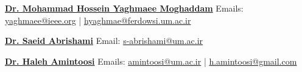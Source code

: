 \documentclass[10pt,a4paper,sans]{moderncv}        %
\begin{document}
\begin{multicols}{2}
	
\cvitem{} {\href{https://scholar.google.com/citations?hl=en&user=ZZrN9q8AAAAJ}{\textbf{Dr. Mohammad Hossein Yaghmaee Moghaddam}}}
\cvitem{} {Emails: \href{mailto:yaghmaee@ieee.org}{yaghmaee@ieee.org} | \href{mailto:hyaghmae@ferdowsi.um.ac.ir}{hyaghmae@ferdowsi.um.ac.ir}}


\cvitem{} {\href{https://scholar.google.com/citations?hl=en&user=lWYGNMAAAAAJ}{\textbf{Dr. Saeid Abrishami}}}
\cvitem{} {Email: \href{mailto:s-abrishami@um.ac.ir}{s-abrishami@um.ac.ir}}


\end{multicols}
\cvitem{} {\href{https://scholar.google.com/citations?hl=en&user=UsoEbboAAAAJ}{\textbf{Dr. Haleh Amintoosi}}}
\cvitem{} {Emails: \href{mailto:amintoosi@um.ac.ir}{amintoosi@um.ac.ir} | \href{mailto:h.amintoosi@gmail.com}{h.amintoosi@gmail.com} }



\end{document}
